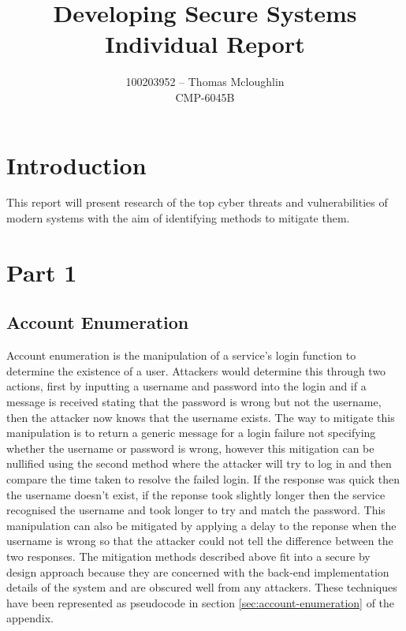 \documentclass{ueacmpstyle}
\begin{document}
	\title{Developing Secure Systems Individual Report}
	\author{
		100203952 -- Thomas Mcloughlin\\
		CMP-6045B
	}
	\maketitle

    \section{Introduction}\label{sec:Intro}
    This report will present research of the top cyber threats and vulnerabilities of modern 
    systems with the aim of identifying methods to mitigate them.

    \section{Part 1}\label{sec:Pt1}
      
      \subsection{Account Enumeration}\label{sub:AccEnum}
      Account enumeration is the manipulation of a service's login function to determine 
      the existence of a user. Attackers would determine this through two actions, first 
      by inputting a username and password into the login and if a message is received 
      stating that the password is wrong but not the username, then the attacker now 
      knows that the username exists. The way to mitigate this manipulation is to return 
      a generic message for a login failure not specifying whether the username or 
      password is wrong, however this mitigation can be nullified using the second method 
      where the attacker will try to log in and then compare the time taken to resolve the 
      failed login. If the response was quick then the username doesn't exist, if the 
      reponse took slightly longer then the service recognised the username and took longer 
      to try and match the password. This manipulation can also be mitigated by applying a 
      delay to the reponse when the username is wrong so that the attacker could not 
      tell the difference between the two responses.
      The mitigation methods described above fit into a secure by design approach because 
      they are concerned with the back-end implementation details of the system and are 
      obscured well from any attackers. These techniques have been represented as 
      pseudocode in section \ref{sec:account-enumeration} of the appendix.
\end{document}
